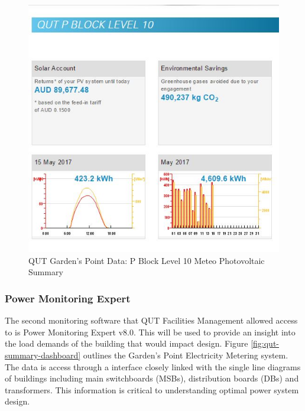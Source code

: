 \begin{figure}[H]
	\hfill\includegraphics[width = 150mm]{images/metering/meteo/lvl10-summary-page}\hspace*{\fill}
	\caption{QUT Garden's Point Data: P Block Level 10 Meteo Photovoltaic Summary} 
	\label{fig:qut-lvl10-meteo-summary}
\end{figure}

\subsubsection{Power Monitoring Expert}

The second monitoring software that QUT Facilities Management allowed access to is Power Monitoring Expert v8.0. This will be used to provide an insight into the load demands of the building that would impact design. Figure \ref{fig:qut-summary-dashboard} outlines the Garden's Point Electricity Metering system. The data is access through a interface closely linked with the single line diagrams of buildings including main switchboards (MSBs), distribution boards (DBs) and transformers. This information is critical to understanding optimal power system design.   

